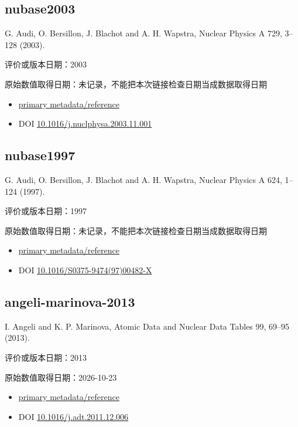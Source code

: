 \documentclass[
  11pt,
  letterpaper,
]{article}
\providecommand{\tightlist}{%
  \setlength{\itemsep}{0pt}\setlength{\parskip}{0pt}}
\begin{document}
\subsection{nubase2003}\label{nubase2003}

G. Audi, O. Bersillon, J. Blachot and A. H. Wapstra, Nuclear Physics A
729, 3--128 (2003).

评价或版本日期：2003

原始数值取得日期：未记录，不能把本次链接检查日期当成数据取得日期

\begin{itemize}
\tightlist
\item
  \href{https://amdc.impcas.ac.cn/nubase/nubase2003/nubtab03.asc}{primary
  metadata/reference}
\item
  DOI
  \href{https://doi.org/10.1016/j.nuclphysa.2003.11.001}{10.1016/j.nuclphysa.2003.11.001}
\end{itemize}

\subsection{nubase1997}\label{nubase1997}

G. Audi, O. Bersillon, J. Blachot and A. H. Wapstra, Nuclear Physics A
624, 1--124 (1997).

评价或版本日期：1997

原始数值取得日期：未记录，不能把本次链接检查日期当成数据取得日期

\begin{itemize}
\tightlist
\item
  \href{https://www.sciencedirect.com/science/article/pii/S037594749700482X}{primary
  metadata/reference}
\item
  DOI
  \href{https://doi.org/10.1016/S0375-9474(97)00482-X}{10.1016/S0375-9474(97)00482-X}
\end{itemize}

\subsection{angeli-marinova-2013}\label{angeli-marinova-2013}

I. Angeli and K. P. Marinova, Atomic Data and Nuclear Data Tables 99,
69--95 (2013).

评价或版本日期：2013

原始数值取得日期：2026-10-23

\begin{itemize}
\tightlist
\item
  \href{https://www-nds.iaea.org/radii/}{primary metadata/reference}
\item
  DOI
  \href{https://doi.org/10.1016/j.adt.2011.12.006}{10.1016/j.adt.2011.12.006}
\end{itemize}
\end{document}
